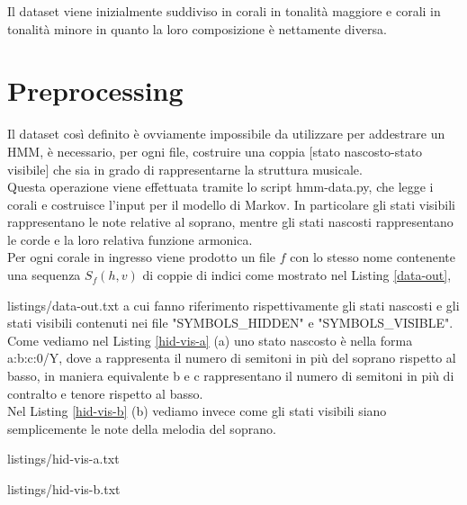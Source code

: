 \noindent
Il dataset viene inizialmente suddiviso in corali in tonalità maggiore e corali in tonalità minore in quanto la loro composizione è nettamente diversa.

\section{Preprocessing}
Il dataset così definito è ovviamente impossibile da utilizzare per addestrare un HMM, è necessario, per ogni file, costruire una coppia [stato nascosto-stato visibile] che sia in grado di rappresentarne la struttura musicale. \\
Questa operazione viene effettuata tramite lo script hmm-data.py, che legge i corali e costruisce l'input per il modello di Markov.
In particolare gli stati visibili rappresentano le note relative al soprano, mentre gli stati nascosti rappresentano le corde e la loro relativa funzione armonica. \\
Per ogni corale in ingresso viene prodotto un file $f$ con lo stesso nome contenente una sequenza $S_f(h, v)$ di coppie di indici come mostrato nel Listing \ref{data-out},

	{listings/data-out.txt}
\noindent
a cui fanno riferimento rispettivamente gli stati nascosti e gli stati visibili contenuti nei file "SYMBOLS\_HIDDEN" e "SYMBOLS\_VISIBLE".
Come vediamo nel Listing \ref{hid-vis-a} (a) uno stato nascosto è nella forma a:b:c:0/Y, dove a rappresenta il numero di semitoni in più del soprano rispetto al basso, in maniera equivalente b e c rappresentano il numero di semitoni in più di contralto e tenore rispetto al basso. \\
Nel Listing \ref{hid-vis-b} (b) vediamo invece come gli stati visibili siano semplicemente le note della melodia del soprano.

\begin{center}
\begin{minipage}[t]{.45\textwidth}
	
		{listings/hid-vis-a.txt}
\end{minipage}
\hspace{.5cm}
\begin{minipage}[t]{.45\textwidth}
	
		{listings/hid-vis-b.txt}
\end{minipage}
\end{center}